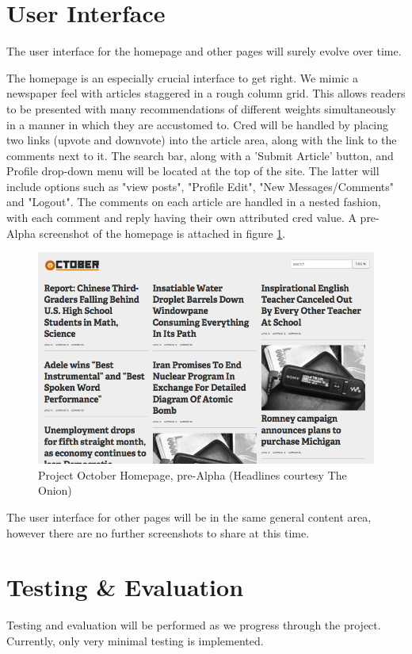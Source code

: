 \documentclass[11pt,letterpaper]{article}
\begin{document}
\section{User Interface}
The user interface for the homepage and other pages will surely evolve over time.

The homepage is an especially crucial interface to get right. We mimic a newspaper feel with articles staggered in a rough column grid.
This allows readers to be presented with many recommendations of different weights simultaneously in a manner in which they are accustomed to. 
Cred will be handled by placing two links (upvote and downvote) into the article area, along with the link to the comments next to it. 
The search bar, along with a 'Submit Article' button, and Profile drop-down menu will be located at the top of the site. The latter will include options such as "view posts", "Profile Edit", "New Messages/Comments" and "Logout".
The comments on each article are handled in a nested fashion, with each comment and reply having their own attributed cred value. 
A pre-Alpha screenshot of the homepage is attached in figure \ref{fig:homepage}.

\begin{figure}
\centering
\includegraphics[scale=0.35]{img/homepage.png}
\caption{Project October Homepage, pre-Alpha (Headlines courtesy The Onion)}
\label{fig:homepage}
\end{figure}

The user interface for other pages will be in the same general content area, however there are no further screenshots to share at this time.

\section{Testing \& Evaluation}
Testing and evaluation will be performed as we progress through the project. Currently, only very minimal testing is implemented.
\end{document}
